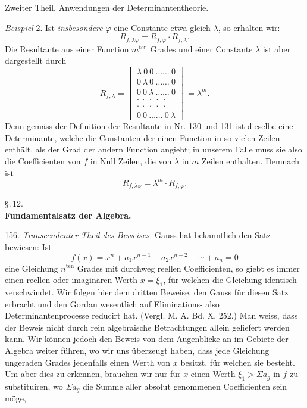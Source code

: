Zweiter Theil. Anwendungen der Determinantentheorie.

\textit{Beispiel} 2. Ist \textit{insbesondere} $\varphi$ eine Constante etwa gleich $\lambda$, so erhalten wir:
\[
R_{f,\lambda\varphi} = R_{f,\varphi}\cdot R_{f,\lambda}.
\]
Die Resultante aus einer Function $m^{\text{ten}}$ Grades und einer Constante $\lambda$ ist aber dargestellt durch
\[
R_{f,\lambda} =
\begin{vmatrix}
\lambda\ 0\ 0\ \ldots\ldots\ 0\\
0\ \lambda\ 0\ \ldots\ldots\ 0\\
0\ 0\ \lambda\ \ldots\ldots\ 0\\
\cdot\ \cdot\ \cdot\ \cdot\ \cdot\\
\cdot\ \cdot\ \cdot\ \cdot\ \cdot\\
0\ 0\ \ldots\ldots\ 0\ \lambda
\end{vmatrix}
= \lambda^m.
\]
Denn gem\"ass der Definition der Resultante in Nr. 130 und 131 ist dieselbe eine Determinante, welche die Constanten der einen Function in so vielen Zeilen enth\"alt, als der Grad der andern Function angiebt; in unserem Falle muss sie also die Coefficienten von $f$ in Null Zeilen, die von $\lambda$ in $m$ Zeilen enthalten. Demnach ist
\[
R_{f,\lambda\varphi} = \lambda^m\cdot R_{f,\varphi}.
\]

\begin{center}
\S.\,12.\\
\textbf{Fundamentalsatz der Algebra.}
\end{center}

156. \textit{Transcendenter Theil des Beweises.} Gauss hat bekanntlich den Satz bewiesen: \glqq Ist
\[
f(x) = x^n + a_1x^{n-1} + a_2x^{n-2} + \cdots + a_n = 0
\]
eine Gleichung $n^{\text{ten}}$ Grades mit durchweg reellen Coefficienten, so giebt es immer einen reellen oder imagin\"aren Werth $x=\xi_1$, f\"ur welchen die Gleichung identisch verschwindet.\grqq{}
Wir folgen hier dem dritten Beweise, den Gauss f\"ur diesen Satz erbracht und den Gordan wesentlich auf Eliminations- also Determinantenprocesse reducirt hat. (Vergl. M. A. Bd. X. 252.) Man weiss, dass der Beweis nicht durch rein algebraische Betrachtungen allein geliefert werden kann. Wir k\"onnen jedoch den Beweis von dem Augenblicke an im Gebiete der Algebra weiter f\"uhren, wo wir uns \"uberzeugt haben, dass jede Gleichung ungeraden Grades jedenfalls einen Werth von $x$ besitzt, f\"ur welchen sie besteht. Um aber dies zu erkennen, brauchen wir nur f\"ur $x$ einen Werth $\xi_1 > \Sigma a_g$ in $f$ zu substituiren, wo $\Sigma a_g$ die Summe aller absolut genommenen Coefficienten sein m\"oge,


